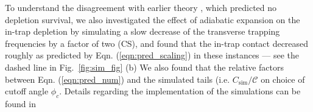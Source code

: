 	To understand the disagreement with earlier theory \cite{Qu16}, which predicted no depletion survival, we also investigated the effect of adiabatic expansion on the in-trap depletion by simulating a slow decrease of the transverse trapping frequencies by a factor of two (CS), and found that the in-trap contact  decreased roughly as predicted by Eqn. (\ref{eqn:pred_scaling}) in these instances --- see the dashed line in Fig.~\ref{fig:sim_fig} (b)  
	We also found that the relative factors between Eqn. (\ref{eqn:pred_num}) and the simulated tails (i.e. $C_\textrm{sim}/\mathcal{C}$  on choice of cutoff angle $\phi_c$. 
	Details regarding the implementation of the simulations can be found in 



